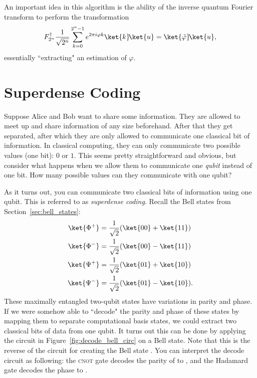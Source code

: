\documentclass[11pt, notitlepage]{report}
\begin{document}
An important idea in this algorithm is the ability of the inverse quantum Fourier transform to perform the transformation
\begin{equation}
  F_{2^n}^\dagger
  \dfrac{1}{\sqrt{2^n}}\sum_{k=0}^{2^n-1} e^{2\pi i\varphi k}\ket{k}\!\ket{u} = \ket{\tilde{\varphi}}\!\ket{u},
\end{equation}
essentially ``extracting" an estimation \ket{\tilde{\varphi}} of $\varphi$.

\section{Superdense Coding}
Suppose Alice and Bob want to share some information. They are allowed to meet up and share information of any size beforehand. After that they get separated, after which they are only allowed to communicate one classical bit of information. In classical computing, they can only communicate two possible values (one bit): $0$ or $1$. This seems pretty straightforward and obvious, but consider what happens when we allow them to communicate one \emph{qubit} instead of one bit. How many possible values can they communicate with one qubit?

As it turns out, you can communicate two classical bits of information using one qubit. This is referred to as \emph{superdense coding}. Recall the Bell states from Section~\ref{sec:bell_states}:
\begin{align}
\ket{\Phi^+} &= \dfrac{1}{\sqrt2}(\ket{00} + \ket{11}) \\
\ket{\Phi^-} &= \dfrac{1}{\sqrt2}(\ket{00} - \ket{11}) \\
\ket{\Psi^+} &= \dfrac{1}{\sqrt2}(\ket{01} + \ket{10}) \\
\ket{\Psi^-} &= \dfrac{1}{\sqrt2}(\ket{01} - \ket{10}).
\end{align}
These maximally entangled two-qubit states have variations in parity and phase. If we were somehow able to ``decode" the parity and phase of these states by mapping them to separate computational basis states, we could extract two classical bits of data from one qubit. It turns out this can be done by applying the circuit in Figure~\ref{fig:decode_bell_circ} on a Bell state. Note that this is the reverse of the circuit for creating the Bell state \ket{\Phi^+}. You can interpret the decode circuit as following: the \textsc{cnot} gate decodes the parity of  to , and the Hadamard gate decodes the phase to .
\end{document}
